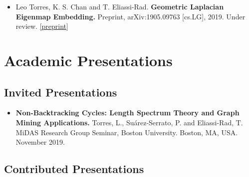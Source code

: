 \documentclass[12pt,]{scrartcl}
\begin{document}
\begin{itemize}
\leftskip-0.25in %

\item Leo Torres, K. S. Chan and T. Eliassi-Rad. \textbf{Geometric Laplacian Eigenmap Embedding.} Preprint, arXiv:1905.09763 [cs.LG], 2019. Under review. \href{https://arxiv.org/abs/1905.09763}{[preprint]}

\end{itemize}


\section{Academic Presentations}\label{presentations}

\subsection{Invited Presentations}\label{invited-presentations}

\begin{itemize}
\leftskip-0.25in %

\item \textbf{Non-Backtracking Cycles: Length Spectrum Theory and Graph Mining Applications.} Torres, L., Su\'arez-Serrato, P. and Eliassi-Rad, T. MiDAS Research Group Seminar, Boston University. Boston, MA, USA. November 2019.

\end{itemize}

\subsection{Contributed Presentations}\label{contributed-presentations}
\end{document}
